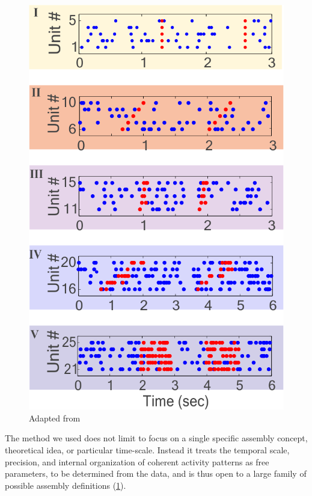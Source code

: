 \begin{figure}
    \centering
    \includegraphics[scale=0.3]{figures/CellAssembliesZoom.png}
    \caption{Adapted from \cite{RussoDurstewitz}}
    \label{fig:CellAsseDet}
\end{figure}
The method we used does not limit to focus on a single specific assembly concept, theoretical idea, or particular time-scale. Instead it treats the temporal scale, precision, and internal organization of coherent activity patterns as free parameters, to be determined from the data, and is thus open to a large family of possible assembly definitions (\ref{fig:CellAsseDet}).\\
